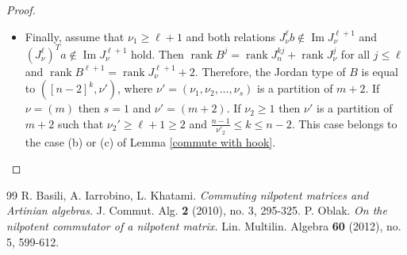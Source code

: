 \documentclass[10pt,a4paper]{amsart}
\DeclareMathOperator{\im}{Im}
\DeclareMathOperator{\rank}{rank}
\begin{document}
\begin{proof}
\begin{itemize}
\item[(v)] Finally, assume that $\nu_1\ge\ell +1$ and both relations $J_{\nu}^{\ell}b\notin\im J_{\nu}^{\ell +1}$ and $\left(J_{\nu}^{\ell}\right)^Ta\notin\im J_{\nu}^{\ell +1} $ hold. Then $\rank B^j=\rank J_n^{kj}+\rank J_{\nu}^j $ for all $j\leq \ell$ and $\rank B^{\ell +1} =\rank J_{\nu}^{\ell +1} +2$. Therefore, the Jordan type of $B$ is equal to $([n-2]^k,\nu')$, where $\nu'=(\nu_1,\nu_2,\ldots,\nu_s)$ is a partition of $m+2$. If $\nu=(m)$ then $s=1$ and $\nu'=(m+2)$. If $\nu_2\ge 1$ then $\nu'$ is a partition of $m+2$ such that $\nu_2'\ge \ell+1\ge 2$ and $\frac{n-1}{\nu'_2}\leq k \leq n-2$. This case belongs to the case (b) or (c) of Lemma \ref{commute with hook}.
\end{itemize}
\end{proof}


\begin{thebibliography}{99}
 R. Basili, A. Iarrobino, L. Khatami. \emph{Commuting nilpotent matrices and Artinian algebras.} J. Commut. Alg. \textbf{2} (2010), no. 3, 295-325.
 P. Oblak. \emph{On the nilpotent commutator of a nilpotent matrix.} Lin. Multilin. Algebra \textbf{60} (2012), no. 5, 599-612.
\end{thebibliography}
\end{document}
